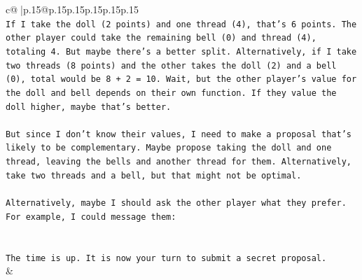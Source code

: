 \documentclass{article}
\begin{document}
{\begin{supertabular}{c@{$\;$}|p{.15\linewidth}@{}p{.15\linewidth}p{.15\linewidth}p{.15\linewidth}p{.15\linewidth}p{.15\linewidth}}
{{{\\ 
\texttt{If I take the doll (2 points) and one thread (4), that's 6 points. The other player could take the remaining bell (0) and thread (4), totaling 4. But maybe there's a better split. Alternatively, if I take two threads (8 points) and the other takes the doll (2) and a bell (0), total would be 8 + 2 = 10. Wait, but the other player's value for the doll and bell depends on their own function. If they value the doll higher, maybe that's better.} \\
\\ 
\texttt{But since I don't know their values, I need to make a proposal that's likely to be complementary. Maybe propose taking the doll and one thread, leaving the bells and another thread for them. Alternatively, take two threads and a bell, but that might not be optimal.} \\
\\ 
\texttt{Alternatively, maybe I should ask the other player what they prefer. For example, I could message them:} \\
\\ 
\\ 
\texttt{The time is up. It is now your turn to submit a secret proposal.} \\
            }
        }
    }
    & \\ \\


\end{supertabular}}
\end{document}
